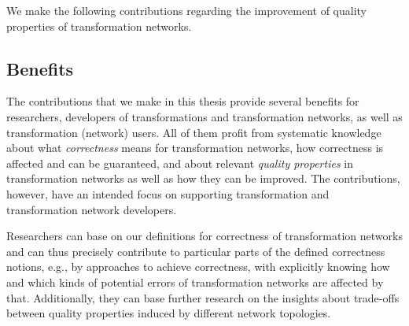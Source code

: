 We make the following contributions regarding the improvement of quality properties of transformation networks.
\begin{contributions}
    \begin{integrationcontribution}
    \end{integrationcontribution}
\end{contributions}


\subsection{Benefits}

The contributions that we make in this thesis provide several benefits for researchers, developers of transformations and transformation networks, as well as transformation (network) users.
All of them profit from systematic knowledge about what \emph{correctness} means for transformation networks, how correctness is affected and can be guaranteed, and about relevant \emph{quality properties} in transformation networks as well as how they can be improved.
The contributions, however, have an intended focus on supporting transformation and transformation network developers. 

Researchers can base on our definitions for correctness of transformation networks and can thus precisely contribute to particular parts of the defined correctness notions, e.g., by approaches to achieve correctness, with explicitly knowing how and which kinds of potential errors of transformation networks are affected by that.
Additionally, they can base further research on the insights about trade-offs between quality properties induced by different network topologies.

